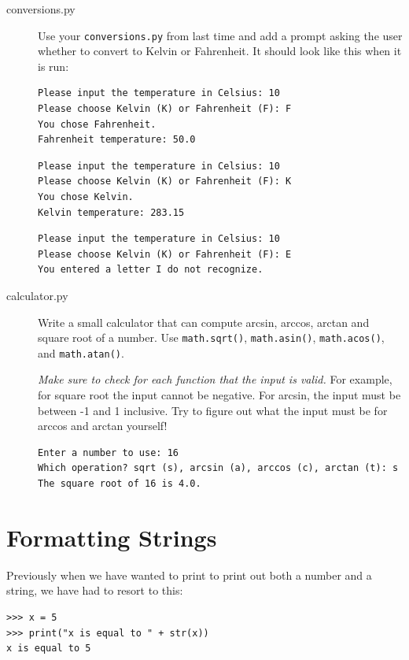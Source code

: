 \documentclass[11pt]{cselabheader}
\begin{document}
\begin{description}
  \item[conversions.py] Use your \texttt{conversions.py} from last time and add a
    prompt asking the user whether to convert to Kelvin or Fahrenheit. It should
    look like this when it is run:

    \begin{lstlisting}[style=bash]
Please input the temperature in Celsius: 10
Please choose Kelvin (K) or Fahrenheit (F): F
You chose Fahrenheit.
Fahrenheit temperature: 50.0
    \end{lstlisting}
    \begin{lstlisting}[style=bash]
Please input the temperature in Celsius: 10
Please choose Kelvin (K) or Fahrenheit (F): K
You chose Kelvin.
Kelvin temperature: 283.15
    \end{lstlisting}
    \begin{lstlisting}[style=bash]
Please input the temperature in Celsius: 10
Please choose Kelvin (K) or Fahrenheit (F): E
You entered a letter I do not recognize.
    \end{lstlisting}

  \item[calculator.py] Write a small calculator that can compute arcsin, arccos,
    arctan and square root of a number. Use \lstinline!math.sqrt()!,
    \lstinline!math.asin()!, \lstinline!math.acos()!, and
    \lstinline!math.atan()!.

    \emph{Make sure to check for each function that the input is valid.} For
    example, for square root the input cannot be negative. For arcsin, the input
    must be between -1 and 1 inclusive. Try to figure out what the input must be
    for arccos and arctan yourself!

    \begin{lstlisting}[style=bash]
Enter a number to use: 16
Which operation? sqrt (s), arcsin (a), arccos (c), arctan (t): s
The square root of 16 is 4.0.
    \end{lstlisting}

\end{description}

\pagebreak
\section{Formatting Strings}
Previously when we have wanted to print to print out both a number and a string, we have had to resort to this:

\begin{lstlisting}[style=ipython]
>>> x = 5
>>> print("x is equal to " + str(x))
x is equal to 5
\end{lstlisting}
\end{document}
